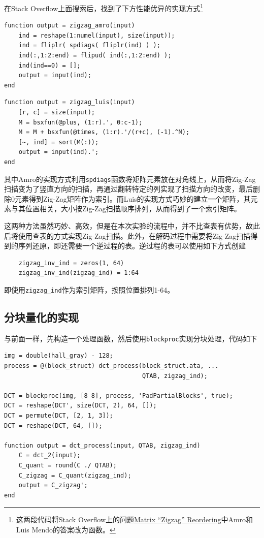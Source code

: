 \documentclass[10pt, a4paper]{article}
\begin{document}
在Stack Overflow上面搜索后，找到了下方性能优异的实现方式\footnote{这两段代码将Stack Overflow上的问题\href{https://stackoverflow.com/questions/3024939/matrix-zigzag-reordering}{Matrix “Zigzag” Reordering}中Amro和Luis Mendo的答案改为函数。}

\begin{verbatim}
function output = zigzag_amro(input)
    ind = reshape(1:numel(input), size(input));
    ind = fliplr( spdiags( fliplr(ind) ) );
    ind(:,1:2:end) = flipud( ind(:,1:2:end) );
    ind(ind==0) = [];
    output = input(ind);
end
\end{verbatim}

\begin{verbatim}
function output = zigzag_luis(input)
    [r, c] = size(input);
    M = bsxfun(@plus, (1:r).', 0:c-1);
    M = M + bsxfun(@times, (1:r).'/(r+c), (-1).^M);
    [~, ind] = sort(M(:));
    output = input(ind).';
end
\end{verbatim}

其中Amro的实现方式利用\texttt{spdiags}函数将矩阵元素放在对角线上，从而将Zig-Zag扫描变为了竖直方向的扫描，再通过翻转特定的列实现了扫描方向的改变，最后删除0元素得到Zig-Zag矩阵作为索引。而Luis的实现方式巧妙的建立一个矩阵，其元素与其位置相关，大小按Zig-Zag扫描顺序排列，从而得到了一个索引矩阵。

这两种方法虽然巧妙、高效，但是在本次实验的流程中，并不比查表有优势，故此后将使用查表的方式实现Zig-Zag扫描。此外，在解码过程中需要将Zig-Zag扫描得到的序列还原，即还需要一个逆过程的表。逆过程的表可以使用如下方式创建

\begin{verbatim}
    zigzag_inv_ind = zeros(1, 64)
    zigzag_inv_ind(zigzag_ind) = 1:64
\end{verbatim}

即使用\texttt{zigzag_ind}作为索引矩阵，按照位置排列1-64。

\subsection{分块量化的实现}\label{sec:preprocess}

与前面一样，先构造一个处理函数，然后使用\texttt{blockproc}实现分块处理，代码如下

\begin{verbatim}
img = double(hall_gray) - 128;
process = @(block_struct) dct_process(block_struct.ata, ...
                                      QTAB, zigzag_ind);

DCT = blockproc(img, [8 8], process, 'PadPartialBlocks', true);
DCT = reshape(DCT', size(DCT, 2), 64, []);
DCT = permute(DCT, [2, 1, 3]);
DCT = reshape(DCT, 64, []);

function output = dct_process(input, QTAB, zigzag_ind)
    C = dct_2(input);
    C_quant = round(C ./ QTAB);
    C_zigzag = C_quant(zigzag_ind);
    output = C_zigzag';
end
\end{verbatim}
\end{document}
